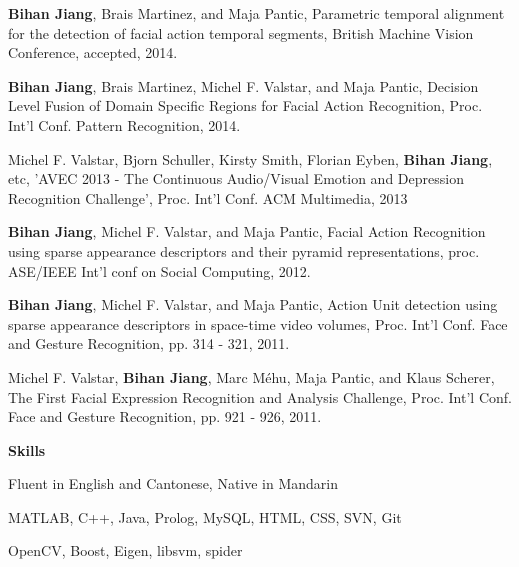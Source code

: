 \documentclass[letterpaper,11pt]{article}
\newcommand{\resheading}[1]{{\large \colorbox{mygrey}{\begin{minipage}{\textwidth}{\textbf{#1 \vphantom{p\^{E}}}}\end{minipage}}}}
\begin{document}
	\begin{itemize}
{ \small
\item \textbf{Bihan Jiang}, Brais Martinez, and Maja Pantic, Parametric temporal alignment for the detection of facial action temporal segments, British Machine Vision Conference, accepted, 2014. 

\item \textbf{Bihan Jiang}, Brais Martinez, Michel F. Valstar, and Maja Pantic, Decision Level Fusion of Domain Specific Regions for Facial Action Recognition, Proc. Int'l Conf. Pattern Recognition, 2014.

\item Michel F. Valstar, Bjorn Schuller, Kirsty Smith, Florian Eyben, \textbf{Bihan Jiang}, etc,  'AVEC 2013 - The Continuous Audio/Visual Emotion and Depression Recognition Challenge', Proc. Int'l Conf. ACM Multimedia, 2013
\item \textbf{Bihan Jiang}, Michel F. Valstar, and Maja Pantic, Facial Action Recognition using sparse appearance descriptors and their pyramid representations, proc. ASE/IEEE Int'l conf on Social Computing, 2012. 
\item \textbf{Bihan Jiang}, Michel F. Valstar, and Maja Pantic, Action Unit detection using sparse appearance descriptors in space-time video volumes, Proc. Int'l Conf. Face and Gesture Recognition, pp. 314 - 321, 2011.
\item Michel F. Valstar, \textbf{Bihan Jiang}, Marc Méhu, Maja Pantic, and Klaus Scherer, The First Facial Expression Recognition and Analysis Challenge, Proc. Int'l Conf. Face and Gesture Recognition, pp. 921 - 926, 2011.
}	
\end{itemize}


\resheading{{Skills}}
	\begin{description}
{\small
		\item[Languages:] {Fluent in English and Cantonese, Native in Mandarin}
		\item[Technologies:] {  MATLAB, C++, Java,
			Prolog, MySQL, HTML, CSS, SVN, Git
		}
		\item[Libraries:] { OpenCV, Boost, Eigen, libsvm, spider			
		}
}
	\end{description} %
\end{document}
